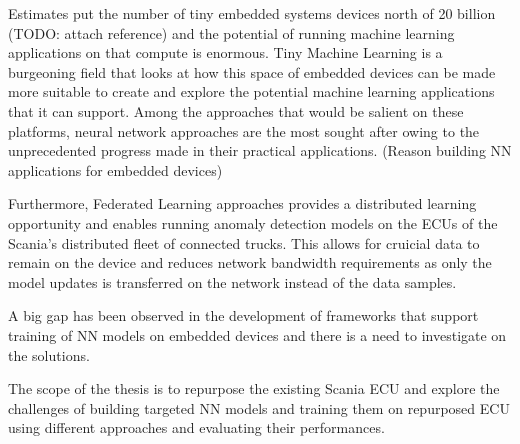 Estimates put the number of tiny embedded systems devices north of 20 billion (TODO: attach reference) and the potential of running machine learning applications on that compute is enormous. Tiny Machine Learning is a burgeoning field that looks at how this space of embedded devices can be made more suitable to create and explore the potential machine learning applications that it can support. Among the approaches that would be salient on these platforms, neural network approaches are the most sought after owing to the unprecedented progress made in their practical applications. (Reason building NN applications for embedded devices)

Furthermore, Federated Learning approaches provides a distributed learning opportunity and enables running anomaly detection models on the ECUs of the Scania's distributed fleet of connected trucks. This allows for cruicial data to remain on the device and reduces network bandwidth requirements as only the model updates is transferred on the network instead of the data samples. 

A big gap has been observed in the development of frameworks that support training of NN models on embedded devices and there is a need to investigate on the solutions. 

The scope of the thesis is to repurpose the existing Scania ECU and explore the challenges of building targeted NN models and training them on repurposed ECU using different approaches and evaluating their performances.





